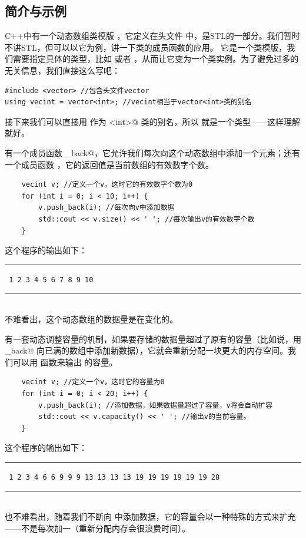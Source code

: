 \subsection*{\lstinline@vector@ 简介与示例}
C++中有一个动态数组类模版 \lstinline@vector@，它定义在头文件 \lstinline@vector@ 中，是STL的一部分。我们暂时不讲STL，但可以以它为例，讲一下类的成员函数的应用。
它是一个类模版，我们需要指定具体的类型，比如 \lstinline@int@ 或者 \lstinline@double@，从而让它变为一个类实例。为了避免过多的无关信息，我们直接这么写吧：
\begin{lstlisting}
#include <vector> //包含头文件vector
using vecint = vector<int>; //vecint相当于vector<int>类的别名
\end{lstlisting}
接下来我们可以直接用 \lstinline@vecint@ 作为 \lstinline@vector<int>@ 类的别名，所以 \lstinline@vecint@ 就是一个类型——这样理解就好。\par
\lstinline@vecint@ 有一个成员函数 \lstinline@push_back@，它允许我们每次向这个动态数组中添加一个元素；还有一个成员函数 \lstinline@size@，它的返回值是当前数组的有效数字个数。
\begin{lstlisting}
    vecint v; //定义一个v，这时它的有效数字个数为0
    for (int i = 0; i < 10; i++) {
        v.push_back(i); //每次向v中添加数据
        std::cout << v.size() << ' '; //每次输出v的有效数字个数
    }
\end{lstlisting}
这个程序的输出如下：\\\noindent\rule{\linewidth}{.2pt}\texttt{
1 2 3 4 5 6 7 8 9 10
}\\\noindent\rule{\linewidth}{.2pt}\\
不难看出，这个动态数组的数据量是在变化的。\par
\lstinline@vecint@ 有一套动态调整容量的机制，如果要存储的数据量超过了原有的容量（比如说，用 \lstinline@push_back@ 向已满的数组中添加新数据），它就会重新分配一块更大的内存空间。我们可以用 \lstinline@capacity@ 函数来输出 \lstinline@v@ 的容量。
\begin{lstlisting}
    vecint v; //定义一个v，这时它的容量为0
    for (int i = 0; i < 20; i++) {
        v.push_back(i); //添加数据，如果数据量超过了容量，v将会自动扩容
        std::cout << v.capacity() << ' '; //输出v的当前容量。
    }
\end{lstlisting}
这个程序的输出如下：\\\noindent\rule{\linewidth}{.2pt}\texttt{
1 2 3 4 6 6 9 9 9 13 13 13 13 19 19 19 19 19 19 28
}\\\noindent\rule{\linewidth}{.2pt}\\
也不难看出，随着我们不断向 \lstinline@v@ 中添加数据，它的容量会以一种特殊的方式来扩充——不是每次加一（重新分配内存会很浪费时间）。\par
